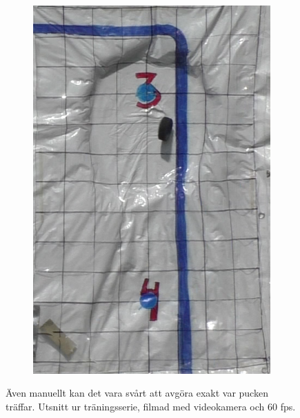 \documentclass[a4paper,12pt]{report}
\begin{document}
\begin{figure}[ht]
\begin{subfigure}[t]{0.24\textwidth}
    \includegraphics[width=\linewidth]{photos/skott4.png}
  \end{subfigure}%

  \caption{Även manuellt kan det vara svårt att avgöra exakt var pucken
    träffar. Utsnitt ur träningsserie, filmad med videokamera och 60 fps.}
  \label{fig:skott}
\end{figure}

\end{document}
